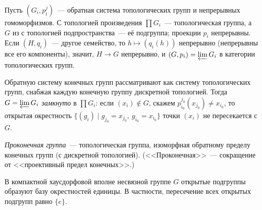 \begin{example}[7.23]
Пусть $(G_i,p^j_i)$~--- обратная система топологических групп и непрерывных гомоморфизмов. С топологией произведения
$\prod G_i$~--- топологическая группа, а $G$ из  с топологией подпространства~--- её подгруппа; проекции $p_i$
непрерывны. Если $(H,q_i)$~--- другое семейство, то $h\mapsto(q_i(h))$ непрерывно (непрерывны все его компоненты),
значит, $H\to G$ непрерывно, и $(G,p_i)=\varprojlim G_i$ в категории топологических групп.

Обратную систему конечных групп рассматривают как систему топологических групп, снабжая каждую конечную группу
дискретной топологией. Тогда $G=\varprojlim G_i$ \emph{замкнуто} в $\prod G_i$: если $(x_i)\notin G$, скажем
$p^{j_0}_{i_0}(x_{j_0})\ne x_{i_0}$, то открытая окрестность $\{(g_i)\mid g_{j_0}=x_{j_0},\ g_{i_0}=x_{i_0}\}$ точки
$(x_i)$ не пересекается с $G$.
\end{example}

\begin{definition}[7.24]
\emph{Проконечная группа}~--- топологическая группа, изоморфная обратному пределу конечных групп (с дискретной
топологией). (<<Проконечная>>~--- сокращение от <<проективный предел конечных>>.)
\end{definition}

\begin{lemma}[7.25a]
В компактной хаусдорфовой вполне несвязной группе $G$ открытые подгруппы образуют базу окрестностей единицы. В частности,
пересечение всех открытых подгрупп равно $\{e\}$.
\end{lemma}

